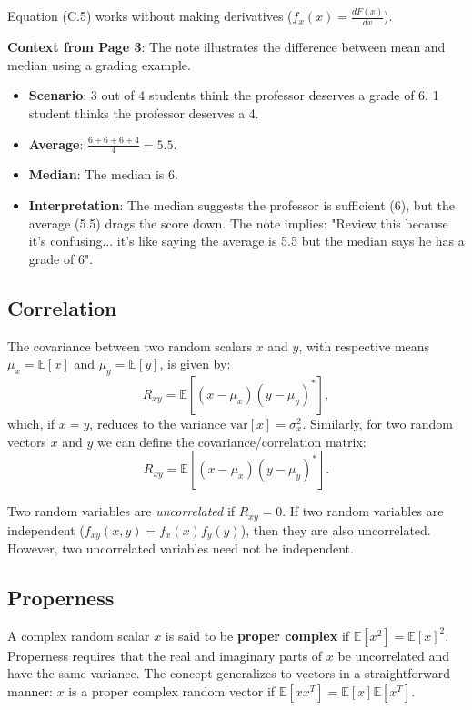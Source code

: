 \documentclass[a4paper, 12pt]{book}
\begin{document}
\begin{purplebox}
Equation (C.5) works without making derivatives ($f_x(x) = \frac{dF(x)}{dx}$).
\end{purplebox}

\begin{greenbox}
\textbf{Context from Page 3}: The note illustrates the difference between mean and median using a grading example.
\begin{itemize}
    \item \textbf{Scenario}: 3 out of 4 students think the professor deserves a grade of 6. 1 student thinks the professor deserves a 4.
    \item \textbf{Average}: $\frac{6+6+6+4}{4} = 5.5$.
    \item \textbf{Median}: The median is 6.
    \item \textbf{Interpretation}: The median suggests the professor is sufficient (6), but the average (5.5) drags the score down. The note implies: "Review this because it's confusing... it's like saying the average is 5.5 but the median says he has a grade of 6".
\end{itemize}
\end{greenbox}

\subsection{Correlation}
The covariance between two random scalars $x$ and $y$, with respective means $\mu_{x}=\mathbb{E}[x]$ and $\mu_{y}=\mathbb{E}[y]$, is given by:
\begin{equation}
    R_{xy} = \mathbb{E}[(x-\mu_{x})(y-\mu_{y})^{*}], \tag{C.6}
\end{equation}
which, if $x=y$, reduces to the variance $\text{var}[x]=\sigma_{x}^{2}$. Similarly, for two random vectors $x$ and $y$ we can define the covariance/correlation matrix:
\begin{equation}
    R_{xy} = \mathbb{E}[(x-\mu_{x})(y-\mu_{y})^{*}]. \tag{C.7}
\end{equation}

Two random variables are \textit{uncorrelated} if $R_{xy}=0$. If two random variables are independent ($f_{xy}(x,y) = f_x(x)f_y(y)$), then they are also uncorrelated. However, two uncorrelated variables need not be independent.

\subsection{Properness}
A complex random scalar $x$ is said to be \textbf{proper complex} if $\mathbb{E}[x^{2}]=\mathbb{E}[x]^{2}$. Properness requires that the real and imaginary parts of $x$ be uncorrelated and have the same variance. The concept generalizes to vectors in a straightforward manner: $x$ is a proper complex random vector if $\mathbb{E}[xx^{T}]=\mathbb{E}[x]\mathbb{E}[x^{T}]$.
\end{document}
